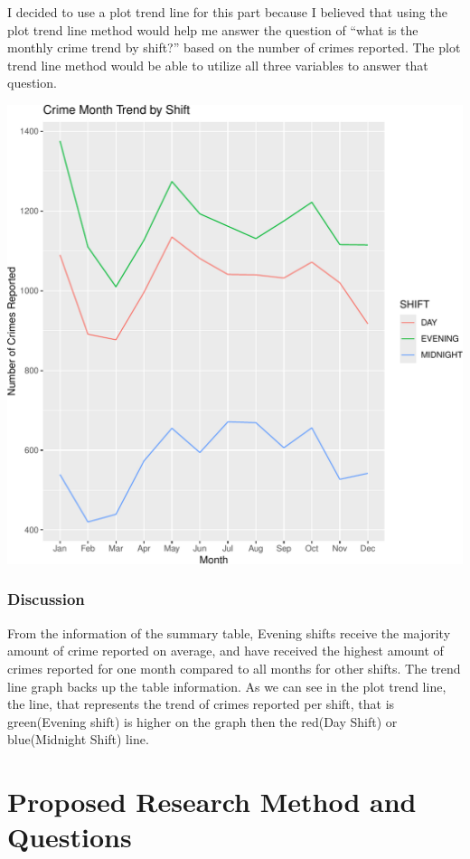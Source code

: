 \documentclass[
]{article}
\begin{document}
I decided to use a plot trend line for this part because I believed that
using the plot trend line method would help me answer the question of
``what is the monthly crime trend by shift?'' based on the number of
crimes reported. The plot trend line method would be able to utilize all
three variables to answer that question.

\begin{center}\includegraphics{./figures/appendix-plot-trend-line-1} \end{center}

\subsubsection{Discussion}\label{discussion-1}

From the information of the summary table, Evening shifts receive the
majority amount of crime reported on average, and have received the
highest amount of crimes reported for one month compared to all months
for other shifts. The trend line graph backs up the table information.
As we can see in the plot trend line, the line, that represents the
trend of crimes reported per shift, that is green(Evening shift) is
higher on the graph then the red(Day Shift) or blue(Midnight Shift)
line.

\section{Proposed Research Method and
Questions}\label{proposed-research-method-and-questions}
\end{document}
